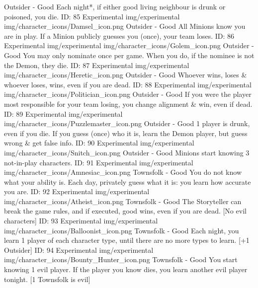 	{\color{goodcolor}Outsider - Good}
	{Each night*, if either good living neighbour is drunk or poisoned, you die.}        
	{ID: 85}
	{Experimental}
	{img/experimental}
	{img/character_icons/Damsel_icon.png}
	{\color{goodcolor}Outsider - Good}
	{All Minions know you are in play. If a Minion publicly guesses you (once), your team loses.}        
	{ID: 86}
	{Experimental}
	{img/experimental}
	{img/character_icons/Golem_icon.png}
	{\color{goodcolor}Outsider - Good}
	{You may only nominate once per game. When you do, if the nominee is not the Demon, they die.}        
	{ID: 87}
	{Experimental}
	{img/experimental}
	{img/character_icons/Heretic_icon.png}
	{\color{goodcolor}Outsider - Good}
	{Whoever wins, loses \& whoever loses, wins, even if you are dead.}        
	{ID: 88}
	{Experimental}
	{img/experimental}
	{img/character_icons/Politician_icon.png}
	{\color{goodcolor}Outsider - Good}
	{If you were the player most responsible for your team losing, you change alignment \& win, even if dead.}        
	{ID: 89}
	{Experimental}
	{img/experimental}
	{img/character_icons/Puzzlemaster_icon.png}
	{\color{goodcolor}Outsider - Good}
	{1 player is drunk, even if you die. If you guess (once) who it is, learn the Demon player, but guess wrong \& get false info.}        
	{ID: 90}
	{Experimental}
	{img/experimental}
	{img/character_icons/Snitch_icon.png}
	{\color{goodcolor}Outsider - Good}
	{Minions start knowing 3 not-in-play characters.}        
	{ID: 91}
	{Experimental}
	{img/experimental}
	{img/character_icons/Amnesiac_icon.png}
	{\color{goodcolor}Townsfolk - Good}
	{You do not know what your ability is. Each day, privately guess what it is: you learn how accurate you are.}        
	{ID: 92}
	{Experimental}
	{img/experimental}
	{img/character_icons/Atheist_icon.png}
	{\color{goodcolor}Townsfolk - Good}
	{The Storyteller can break the game rules, and if executed, good wins, even if you are dead. [No evil characters]}        
	{ID: 93}
	{Experimental}
	{img/experimental}
	{img/character_icons/Balloonist_icon.png}
	{\color{goodcolor}Townsfolk - Good}
	{Each night, you learn 1 player of each character type, until there are no more types to learn. [+1 Outsider]}        
	{ID: 94}
	{Experimental}
	{img/experimental}
	{img/character_icons/Bounty_Hunter_icon.png}
	{\color{goodcolor}Townsfolk - Good}
	{You start knowing 1 evil player. If the player you know dies, you learn another evil player tonight. [1 Townsfolk is evil]}        
